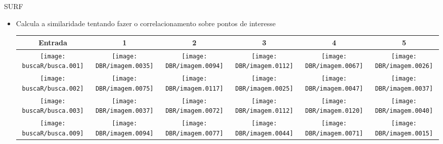 \documentclass[
    style=paintings,
    paper=screen,
    blackslide,
    nopagebreaks,
    fleqn
]{powerdot}
\begin{document}
\begin{slide}{SURF}
\begin{itemize}[type=1]
\item <1-> Calcula a similaridade tentando fazer o correlacionamento sobre pontos de interesse
\vspace{-0.8cm}
\begin{table}[H]
\begin{center}
\begin{tabular}{c|ccccc}
\hline 
Entrada & 1 & 2 & 3 & 4 & 5\tabularnewline
\hline
\texttt{[image: buscaR/busca.001]} & 
\texttt{[image: DBR/imagem.0035]} & 
\texttt{[image: DBR/imagem.0094]} & 
\texttt{[image: DBR/imagem.0112]} & 
\texttt{[image: DBR/imagem.0067]} &
\texttt{[image: DBR/imagem.0026]} 
\tabularnewline
\hline 
\texttt{[image: buscaR/busca.002]} & 
\texttt{[image: DBR/imagem.0075]} & 
\texttt{[image: DBR/imagem.0117]} & 
\texttt{[image: DBR/imagem.0025]} & 
\texttt{[image: DBR/imagem.0047]} &
\texttt{[image: DBR/imagem.0037]} 
\tabularnewline
\hline 
\texttt{[image: buscaR/busca.003]} & 
\texttt{[image: DBR/imagem.0037]} & 
\texttt{[image: DBR/imagem.0072]} & 
\texttt{[image: DBR/imagem.0112]} & 
\texttt{[image: DBR/imagem.0120]} &
\texttt{[image: DBR/imagem.0040]} 
\tabularnewline
\hline 
\texttt{[image: buscaR/busca.009]} & 
\texttt{[image: DBR/imagem.0094]} & 
\texttt{[image: DBR/imagem.0077]} & 
\texttt{[image: DBR/imagem.0044]} & 
\texttt{[image: DBR/imagem.0071]} &
\texttt{[image: DBR/imagem.0015]} 
\tabularnewline
\hline 
\end{tabular}
\end{center}
\end{table}
\end{itemize}
\end{slide}
\end{document}
